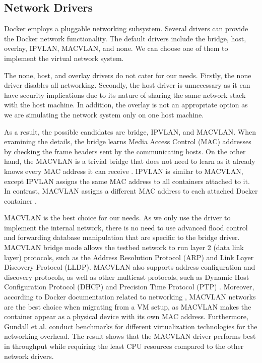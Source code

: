 \documentclass[article]{aaltoseries}
\begin{document}
\subsection{Network Drivers}
Docker employs a pluggable networking subsystem. Several drivers can provide the Docker network functionality. The default drivers include the bridge, host, overlay, IPVLAN, MACVLAN, and none. We can choose one of them to implement the virtual network system.

The none, host, and overlay drivers do not cater for our needs. Firstly, the none driver disables all networking. Secondly, the host driver is unnecessary as it can have security implications due to its nature of sharing the same network stack with the host machine. In addition, the overlay is not an appropriate option as we are simulating the network system only on one host machine.

As a result, the possible candidates are bridge, IPVLAN, and MACVLAN. When examining the details, the bridge learns Media Access Control (MAC) addresses by checking the frame headers sent by the communicating hosts. On the other hand, the MACVLAN is a trivial bridge that does not need to learn as it already knows every MAC address it can receive \cite{9620212}. IPVLAN is similar to MACVLAN, except IPVLAN assigns the same MAC address to all containers attached to it. In contrast, MACVLAN assigns a different MAC address to each attached Docker container \cite{7502883}.

MACVLAN is the best choice for our needs. As we only use the driver to implement the internal network, there is no need to use advanced flood control and forwarding database manipulation that are specific to the bridge driver. MACVLAN bridge mode allows the testbed network to run layer 2 (data link layer) protocols, such as the Address Resolution Protocol (ARP) and Link Layer Discovery Protocol (LLDP). MACVLAN also supports address configuration and discovery protocols, as well as other multicast protocols, such as Dynamic Host Configuration Protocol (DHCP) \cite{9708884} and Precision Time Protocol (PTP) \cite{9613320}. Moreover, according to Docker documentation related to networking \cite{docker_documentation_2023}, MACVLAN networks are the best choice when migrating from a VM setup, as MACVLAN makes the container appear as a physical device with its own MAC address. Furthermore, Gundall et al. \cite{9442123} conduct benchmarks for different virtualization technologies for the networking overhead. The result shows that the MACVLAN driver performs best in throughput while requiring the least CPU resources compared to the other network drivers.
\end{document}
